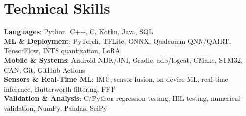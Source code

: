 \documentclass[letterpaper,11pt]{article}
\begin{document}
\section{Technical Skills}
  \resumeSubHeadingListStart
    \small{\item{
      \textbf{Languages}{: Python, C++, C, Kotlin, Java, SQL} \\
      \textbf{ML \& Deployment}{: PyTorch, TFLite, ONNX, Qualcomm QNN/QAIRT, TensorFlow, INT8 quantization, LoRA} \\
      \textbf{Mobile \& Systems}{: Android NDK/JNI, Gradle, adb/logcat, CMake, STM32, CAN, Git, GitHub Actions} \\
      \textbf{Sensors \& Real-Time ML}{: IMU, sensor fusion, on-device ML, real-time inference, Butterworth filtering, FFT} \\
      \textbf{Validation \& Analysis}{: C/Python regression testing, HIL testing, numerical validation, NumPy, Pandas, SciPy}
    }}
  \resumeSubHeadingListEnd
\end{document}
